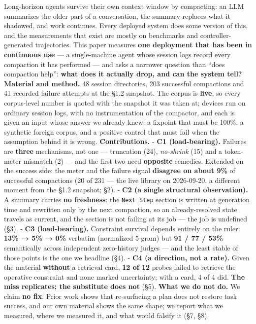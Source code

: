 \documentclass[
]{article}
\newcounter{none} %
\begin{document}
Long-horizon agents survive their own context window by compacting: an
LLM summarizes the older part of a conversation, the summary replaces
what it shadowed, and work continues. Every deployed system does some
version of this, and the measurements that exist are mostly on
benchmarks and controller-generated trajectories. This paper measures
\textbf{one deployment that has been in continuous use} --- a
single-machine agent whose session logs record every compaction it has
performed --- and asks a narrower question than ``does compaction
help'': \textbf{what does it actually drop, and can the system tell?}
\textbf{Material and method.} 48 session directories, 203 successful
compactions and 41 recorded failure attempts at the §1.2 snapshot. The
corpus is \textbf{live}, so every corpus-level number is quoted with the
snapshot it was taken at; devices run on ordinary session logs, with no
instrumentation of the compactor, and each is given an input whose
answer we already knew: a fixpoint that must be 100\%, a synthetic
foreign corpus, and a positive control that must fail when the
assumption behind it is wrong. \textbf{Contributions.} - \textbf{C1
(load-bearing).} Failures are \textbf{three} mechanisms, not one ---
truncation (24), \emph{no-shrink} (15) and a token-meter mismatch (2)
--- and the first two need \textbf{opposite} remedies. Extended on the
success side: the meter and the failure signal \textbf{disagree on about
9\%} of successful compactions (20 of 231 --- the live library on
2026-09-20, a different moment from the §1.2 snapshot; §2). - \textbf{C2
(a single structural observation).} A summary carries \textbf{no
freshness}: the \texttt{Next\ Step} section is written at generation
time and rewritten only by the next compaction, so an already-resolved
state travels as current, and the section is not failing at its job ---
the job is undefined (§3). - \textbf{C3 (load-bearing).} Constraint
survival depends entirely on the ruler: \textbf{13\% → 5\% → 0\%}
verbatim (normalized 5-gram) but \textbf{91 / 77 / 53\%} semantically
across independent zero-history judges --- and the least stable of those
points is the one we headline (§4). - \textbf{C4 (a direction, not a
rate).} Given the material \textbf{without} a retrieval card, \textbf{12
of 12} probes failed to retrieve the operative constraint and none
marked uncertainty; with a card, 4 of 4 did. \textbf{The miss
replicates; the substitute does not} (§5). \textbf{What we do not do.}
We claim \textbf{no fix}. Prior work shows that re-surfacing a plan does
not restore task success, and our own material shows the same shape; we
report what we measured, where we measured it, and what would falsify it
(§7, §8).
\end{document}
